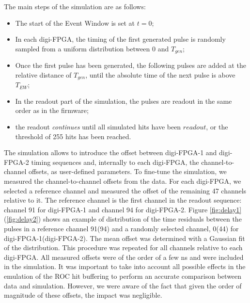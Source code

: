 The main steps of the simulation are as follows:
\begin{itemize}
\item
  The start of the Event Window is set at $t=0$;
\item
  In each digi-FPGA, the timing of the first generated pulse 
  is randomly sampled from a uniform distribution between 0 and $T_{gen}$;
\item
Once the first pulse has been generated, the following pulses are 
added at the relative distance of $T_{gen}$,
  until the absolute time of the next pulse is above $T_{EW}$;
\item
  In the readout part of the simulation, 
  the pulses are readout in the same order as in the firmware;
\item
  the readout \textit{continues} until all simulated hits 
  have been $readout$, or the threshold of 255 hits has been reached.
\end{itemize}
The simulation allows to introduce the offset between digi-FPGA-1 
and digi-FPGA-2 timing sequences and, 
internally to each digi-FPGA, the channel-to-channel 
offsets, as user-defined parameters.
To fine-tune the simulation, we measured the channel-to-channel 
offsets from the data. For each digi-FPGA, we selected 
a reference channel
and measured the offset of the 
remaining 47 channels relative to it.
The reference channel is the first channel in the readout sequence: channel 91 for 
digi-FPGA-1 and channel 94 for digi-FPGA-2. 
Figure \ref{fig:delay1}(\ref{fig:delay2}) shows an example of 
distribution of the time residuals between the pulses in a reference 
channel 91(94) and a randomly selected channel, 0(44) for 
digi-FPGA-1(digi-FPGA-2). 
The mean offset was determined with a  
Gaussian fit of the distribution. 
This procedure was repeated for all channels 
relative to each digi-FPGA.
All measured offsets were of the order of a 
few ns and were included in the simulation. 
It was important to take into account all possible 
effects in the emulation of the ROC hit buffering 
to perform an accurate comparison between data and 
simulation. However, we were aware of the fact that 
given the order of magnitude of these offsets, the 
impact was negligible.



